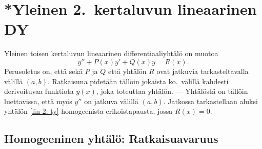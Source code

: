 \section{*Yleinen 2.\ kertaluvun lineaarinen DY} \label{2. kertaluvun lineaarinen DY}
\alku
{}

Yleinen toisen kertaluvun lineaarinen differentiaaliyhtälö on muotoa
\begin{equation} \label{lin-2: ty}
y''+P(x)y'+Q(x)y=R(x).
\end{equation}
Perusoletus on, että sekä
 $P$ ja $Q$ että yhtälön  $R$ 
ovat jatkuvia tarkasteltavalla välillä $(a,b)$. Ratkaisuna pidetään tällöin jokaista ko.\
välillä kahdesti derivoituvaa funktiota $y(x)$, joka toteuttaa yhtälön. --- Yhtälöstä on
tällöin luettavissa, että myös $y''$ on jatkuva välillä $(a,b)$. Jatkossa tarkastellaan aluksi
yhtälön \eqref{lin-2: ty} homogeenista erikoistapausta, jossa $R(x)=0$.

\subsection{Homogeeninen yhtälö: Ratkaisuavaruus}

